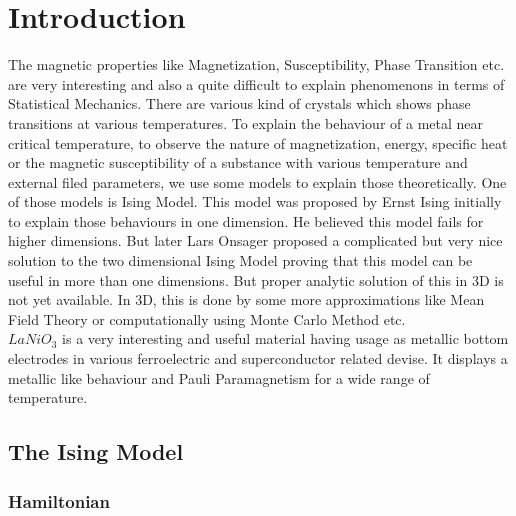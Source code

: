 \documentclass[24pt]{article}
\begin{document}
\section{{\Large Introduction}}
{\large The magnetic properties like Magnetization, Susceptibility, Phase Transition etc. are very interesting and also a quite difficult to explain phenomenons in terms of Statistical Mechanics. There are various kind of crystals which shows phase transitions at various temperatures. To explain the behaviour of a metal near critical temperature, to observe the nature of magnetization, energy, specific heat or the magnetic susceptibility of a substance with various temperature and external filed parameters, we use some models to explain those theoretically. One of those models is Ising Model. This model was proposed by Ernst Ising initially to explain those behaviours in one dimension. He believed this model fails for higher dimensions. But later Lars Onsager proposed a complicated but very nice solution to the two dimensional Ising Model proving that this model can be useful in more than one dimensions. But proper analytic solution of this in 3D is not yet available. In 3D, this is done by some more approximations like Mean Field Theory or computationally using Monte Carlo Method etc.   \\ 
$LaNiO_3$ is a very interesting and useful material having usage as metallic bottom electrodes in various ferroelectric and superconductor related devise. It displays a metallic like behaviour and Pauli Paramagnetism for a wide range of temperature.\\}

\subsection{{\large \textbf{The Ising Model}}}

\subsubsection{\large \textbf{Hamiltonian}}
\end{document}

